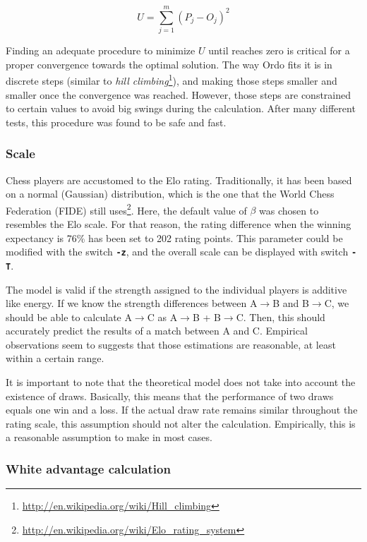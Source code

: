 \documentclass[12pt]{article}
\newcommand{\swtch} [1] {\texttt{\textbf{#1}}}
\begin{document}
	\begin{equation}
	U = \sum\limits_{j=1}^m (P_{j} - O_{j})^2
	\end{equation}

Finding an adequate procedure to minimize $U$ until reaches zero is critical for a proper convergence towards the optimal solution. 
The way Ordo fits it is in discrete steps (similar to \textit{hill climbing}\footnote{\url{http://en.wikipedia.org/wiki/Hill_climbing}}), and making those steps smaller and smaller once the convergence was reached. 
However, those steps are constrained to certain values to avoid big swings during the calculation.
After many different tests, this procedure was found to be safe and fast. 

\subsubsection*{Scale}

Chess players are accustomed to the Elo rating. 
Traditionally, it has been based on a normal (Gaussian) distribution, which is the one that the World Chess Federation (FIDE) still uses\footnote{\url{http://en.wikipedia.org/wiki/Elo_rating_system}}.
Here, the default value of $\beta$ was chosen to resembles the Elo scale.  
For that reason, the rating difference when the winning expectancy is 76\% has been set to 202 rating points.
This parameter could be modified with the switch \swtch{-z}, and the overall scale can be displayed with switch \swtch{-T}.

The model is valid if the strength assigned to the individual players is additive like energy. 
If we know the strength differences between A$\to$B and B$\to$C, we should be able to calculate A$\to$C as A$\to$B + B$\to$C.
Then, this should accurately predict the results of a match between A and C. 
Empirical observations seem to suggests that those estimations are reasonable, at least within a certain range. 

It is important to note that the theoretical model does not take into account the existence of draws. 
Basically, this means that the performance of two draws equals one win and a loss.
If the actual draw rate remains similar throughout the rating scale, this assumption should not alter the calculation.
Empirically, this is a reasonable assumption to make in most cases.

\subsubsection*{White advantage calculation}
\end{document}
